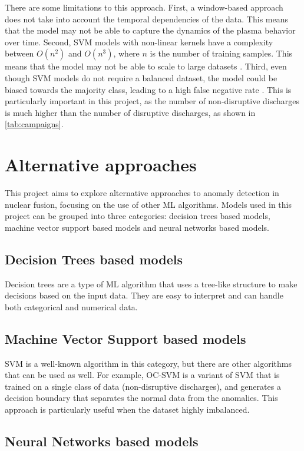 There are some limitations to this approach. First, a window-based approach does not take into account the temporal dependencies of the data. This means that the model may not be able to capture the dynamics of the plasma behavior over time. Second, \ac{SVM} models with non-linear kernels have a complexity between $O(n^2)$ and $O(n^3)$, where $n$ is the number of training samples. This means that the model may not be able to scale to large datasets \autocite{kekulawalaSupportVectorMachines2024}. Third, even though \ac{SVM} models do not require a balanced dataset, the model could be biased towards the majority class, leading to a high false negative rate \autocite{10.1007/978-3-540-30115-8_7}. This is particularly important in this project, as the number of non-disruptive discharges is much higher than the number of disruptive discharges, as shown in \autoref{tab:campaigns}.

\section{Alternative approaches}

This project aims to explore alternative approaches to anomaly detection in nuclear fusion, focusing on the use of other \ac{ML} algorithms. Models used in this project can be grouped into three categories: decision trees based models, machine vector support based models and neural networks based models.

\subsection{Decision Trees based models}

Decision trees are a type of \ac{ML} algorithm that uses a tree-like structure to make decisions based on the input data. They are easy to interpret and can handle both categorical and numerical data. 


\subsection{Machine Vector Support based models}

\ac{SVM} is a well-known algorithm in this category, but there are other algorithms that can be used as well. For example, \ac{OC-SVM} is a variant of \ac{SVM} that is trained on a single class of data (non-disruptive discharges), and generates a decision boundary that separates the normal data from the anomalies. This approach is particularly useful when the dataset highly imbalanced.


\subsection{Neural Networks based models}

